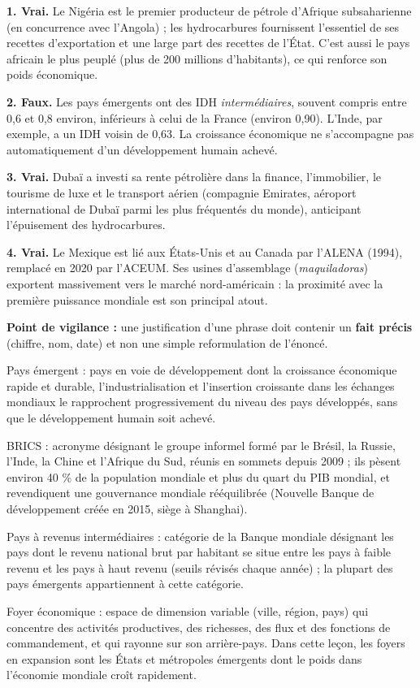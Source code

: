 \documentclass[11pt]{article}
\newcommand{\cle}[1]{{\popxbold\color{popdark}#1}}
\begin{document}
\begin{corrige}
\textbf{1. Vrai.} Le Nigéria est le premier producteur de pétrole d'Afrique subsaharienne (en concurrence avec l'Angola) ; les hydrocarbures fournissent l'essentiel de ses recettes d'exportation et une large part des recettes de l'État. C'est aussi le pays africain le plus peuplé (plus de 200 millions d'habitants), ce qui renforce son poids économique.

\textbf{2. Faux.} Les pays émergents ont des IDH \emph{intermédiaires}, souvent compris entre 0,6 et 0,8 environ, inférieurs à celui de la France (environ 0,90). L'Inde, par exemple, a un IDH voisin de 0,63. La croissance économique ne s'accompagne pas automatiquement d'un développement humain achevé.

\textbf{3. Vrai.} Dubaï a investi sa rente pétrolière dans la finance, l'immobilier, le tourisme de luxe et le transport aérien (compagnie Emirates, aéroport international de Dubaï parmi les plus fréquentés du monde), anticipant l'épuisement des hydrocarbures.

\textbf{4. Vrai.} Le Mexique est lié aux États-Unis et au Canada par l'ALENA (1994), remplacé en 2020 par l'ACEUM. Ses usines d'assemblage (\emph{maquiladoras}) exportent massivement vers le marché nord-américain : la proximité avec la première puissance mondiale est son principal atout.

\textbf{Point de vigilance :} une justification d'une phrase doit contenir un \textbf{fait précis} (chiffre, nom, date) et non une simple reformulation de l'énoncé.
\end{corrige}

\begin{corrige}
\cle{Pays émergent} : pays en voie de développement dont la croissance économique rapide et durable, l'industrialisation et l'insertion croissante dans les échanges mondiaux le rapprochent progressivement du niveau des pays développés, sans que le développement humain soit achevé.

\cle{BRICS} : acronyme désignant le groupe informel formé par le Brésil, la Russie, l'Inde, la Chine et l'Afrique du Sud, réunis en sommets depuis 2009 ; ils pèsent environ 40 \% de la population mondiale et plus du quart du PIB mondial, et revendiquent une gouvernance mondiale rééquilibrée (Nouvelle Banque de développement créée en 2015, siège à Shanghai).

\cle{Pays à revenus intermédiaires} : catégorie de la Banque mondiale désignant les pays dont le revenu national brut par habitant se situe entre les pays à faible revenu et les pays à haut revenu (seuils révisés chaque année) ; la plupart des pays émergents appartiennent à cette catégorie.

\cle{Foyer économique} : espace de dimension variable (ville, région, pays) qui concentre des activités productives, des richesses, des flux et des fonctions de commandement, et qui rayonne sur son arrière-pays. Dans cette leçon, les foyers en expansion sont les États et métropoles émergents dont le poids dans l'économie mondiale croît rapidement.
\end{corrige}
\end{document}

